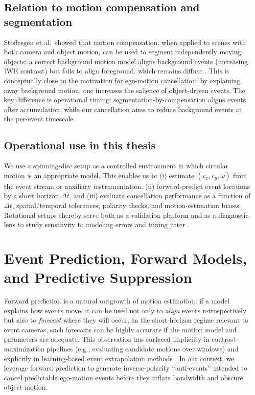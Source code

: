 \subsection{Relation to motion compensation and segmentation}
Stoffregen et al.\ showed that motion compensation, when applied to scenes with both camera and object motion, can be used to segment independently moving objects: a correct background motion model aligns background events (increasing IWE contrast) but fails to align foreground, which remains diffuse \cite{Stoffregen2019Segmentation}. This is conceptually close to the motivation for ego-motion cancellation: by explaining away background motion, one increases the salience of object-driven events. The key difference is operational timing: segmentation-by-compensation aligns events after accumulation, while our cancellation aims to reduce background events at the per-event timescale.

\subsection{Operational use in this thesis}
We use a spinning-disc setup as a controlled environment in which circular motion is an appropriate model. This enables us to (i) estimate $(c_x,c_y,\omega)$ from the event stream or auxiliary instrumentation, (ii) forward-predict event locations by a short horizon $\Delta t$, and (iii) evaluate cancellation performance as a function of $\Delta t$, spatial/temporal tolerances, polarity checks, and motion-estimation biases. Rotational setups thereby serve both as a validation platform and as a diagnostic lens to study sensitivity to modeling errors and timing jitter \cite{Gallego2017Angular,Gallego2018CMax}.

\section{Event Prediction, Forward Models, and Predictive Suppression}
\label{sec:prediction-suppression}

Forward prediction is a natural outgrowth of motion estimation: if a model explains how events move, it can be used not only to \emph{align} events retrospectively but also to \emph{forecast} where they will occur. In the short-horizon regime relevant to event cameras, such forecasts can be highly accurate if the motion model and parameters are adequate. This observation has surfaced implicitly in contrast-maximization pipelines (e.g., evaluating candidate motions over windows) and explicitly in learning-based event extrapolation methods \cite{Gallego2018CMax,Gallego2020Survey}. In our context, we leverage forward prediction to generate inverse-polarity ``anti-events'' intended to cancel predictable ego-motion events before they inflate bandwidth and obscure object motion.

